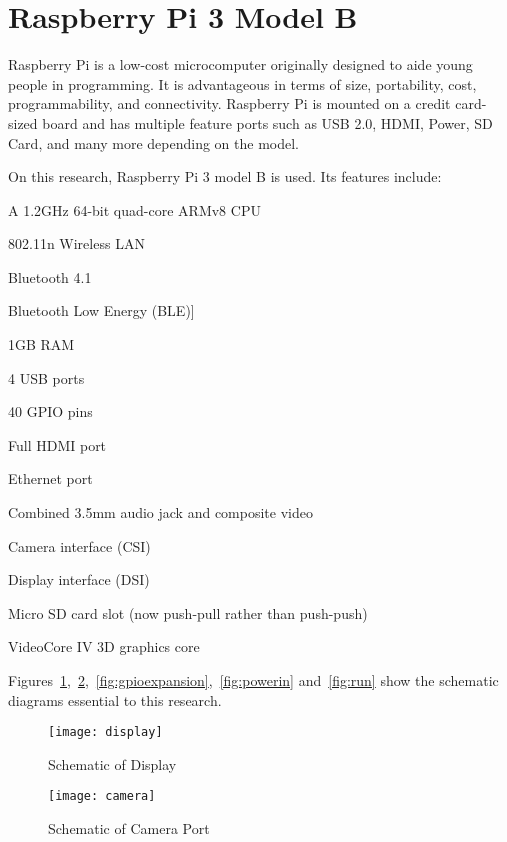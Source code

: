 \section{Raspberry Pi 3 Model B}

	Raspberry Pi is a low-cost microcomputer originally designed to aide young people in programming. It is advantageous in terms of size, portability, cost, programmability, and connectivity. Raspberry Pi is mounted on a credit card-sized board and has multiple feature ports such as USB 2.0, HDMI, Power, SD Card, and many more depending on the model.

	On this research, Raspberry Pi 3 model B is used. Its features include:
\begin{itemize}

\item {A 1.2GHz 64-bit quad-core ARMv8 CPU}
\item {802.11n Wireless LAN}
\item {Bluetooth 4.1}
\item {Bluetooth Low Energy (BLE)]
\item {1GB RAM}
\item {4 USB ports}
\item {40 GPIO pins}
\item {Full HDMI port}
\item {Ethernet port}
\item {Combined 3.5mm audio jack and composite video}
\item {Camera interface (CSI)}
\item {Display interface (DSI)}
\item {Micro SD card slot (now push-pull rather than push-push)}
\item {VideoCore IV 3D graphics core}
}
\end{itemize}

Figures~\ref{fig:display},~\ref{fig:camera},~\ref{fig:gpioexpansion},~\ref{fig:powerin} and~\ref{fig:run} show the schematic diagrams essential to this research.

\begin{figure}[!htbp]
	\centering
		\texttt{[image: display]}
	\caption{Schematic of Display~\cite{Schem}}
	\label{fig:display}
\end{figure}

\begin{figure}[!htbp]
	\centering
		\texttt{[image: camera]}
	\caption{Schematic of Camera Port~\cite{Schem}}
	\label{fig:camera}
\end{figure}

